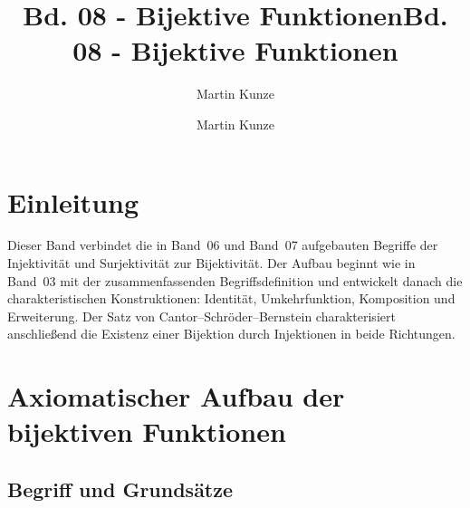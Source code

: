 \documentclass[main.tex]{subfiles}
\title{Bd. 08 - Bijektive Funktionen}
\author{Martin Kunze}
\date{}
\begin{document}
\title{Bd. 08 - Bijektive Funktionen}
\author{Martin Kunze}
\date{}
\hypersetup{pageanchor=false}
\maketitle
\hypersetup{pageanchor=true}
\setcounter{tocdepth}{3}
\tableofcontents
\setcounter{file}{8}
\renewcommand{\FormulaBandID}{8}

\chapter{Einleitung}

Dieser Band verbindet die in Band~06 und Band~07 aufgebauten Begriffe der
Injektivität und Surjektivität zur Bijektivität. Der Aufbau beginnt wie in
Band~03 mit der zusammenfassenden Begriffsdefinition und entwickelt danach
die charakteristischen Konstruktionen: Identität, Umkehrfunktion,
Komposition und Erweiterung. Der Satz von Cantor--Schröder--Bernstein
charakterisiert anschließend die Existenz einer Bijektion durch Injektionen
in beide Richtungen.

\chapter{Axiomatischer Aufbau der bijektiven Funktionen}

\section{Begriff und Grundsätze}


\begin{tabproof}
\end{tabproof}
\end{document}
